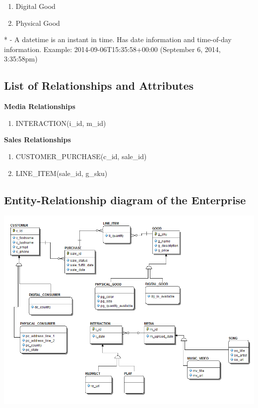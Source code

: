 \documentclass[11pt, a4paper]{report}
\begin{document}
\begin{enumerate}
\item Digital Good

\item Physical Good

\end{enumerate}

* - A datetime is an instant in time. Has date information and time-of-day information. Example: 2014-09-06T15:35:58+00:00 (September 6, 2014, 3:35:58pm)

\clearpage
\subsection{List of Relationships and Attributes}

\noindent\textbf{Media Relationships}
\begin{enumerate}
\item INTERACTION(i\_id, m\_id)
\end{enumerate}

\noindent\textbf{Sales Relationships}
\begin{enumerate}
\item CUSTOMER\_PURCHASE(c\_id, sale\_id)
\item LINE\_ITEM(sale\_id, g\_sku)
\end{enumerate}

\clearpage
\subsection{Entity-Relationship diagram of the Enterprise}
\includegraphics[width=\textwidth]{ERB.png}
\end{document}
